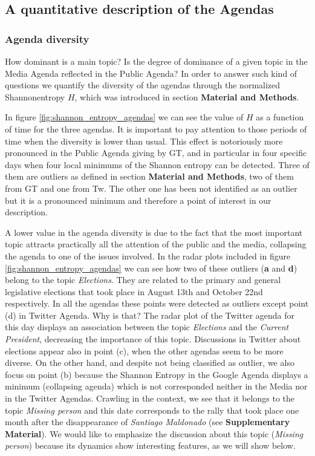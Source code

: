\documentclass{bmcart}
\begin{document}
\subsection*{A quantitative description of the Agendas}

\subsubsection*{Agenda diversity}

\par How dominant is a main topic? Is the degree of dominance of a given topic in the Media Agenda reflected in the Public Agenda? In order to answer such kind of questions we quantify the diversity of the agendas through the normalized Shannonentropy $H$, which was introduced in section \textbf{Material and Methods}.
\par In figure \ref{fig:shannon_entropy_agendas} we can see the value of $H$ as a function of time for the three agendas. It is important to pay attention to those periods of time when the diversity is lower than usual. This effect is notoriously more pronounced in the Public Agenda giving by GT, and in particular in four specific days when four local minimums of the Shannon entropy can be detected. Three of them are outliers as defined in section \textbf{Material and Methods}, two of them from GT and one from Tw. The other one has been not identified as an outlier but it is a pronounced minimum and therefore a point of interest in our description. 
 
\par A lower value in the agenda diversity is due to the fact that the most important topic attracts practically all the attention of the public and the media, collapsing the agenda to one of the issues involved.
In the radar plots included in figure \ref{fig:shannon_entropy_agendas} we can see how two of these outliers (\textbf{a} and \textbf{d}) belong to the topic \emph{Elections}. They are related to the primary and general legislative elections that took place in August 13th and October 22nd respectively.
In all the agendas these points were detected as outliers except point (d) in Twitter Agenda. Why is that? The radar plot of the Twitter agenda for this day displays an association between the topic \emph{Elections} and the \emph{Current President}, decreasing the importance of this topic.
Discussions in Twitter about elections appear also in point (c), when the other agendas seem to be more diverse. 
On the other hand, and despite not being classified as outlier, we also focus on point (b) because the Shannon Entropy in the Google Agenda displays a minimum (collapsing agenda) which is not corresponded neither in the Media nor in the Twitter Agendas. Crawling in the context, we see that it belongs to the topic \emph{Missing person} and this date corresponds to the rally that took place one month after the disappearance of \emph{Santiago Maldonado} (see \textbf{Supplementary Material}). 
We  would like to emphasize the discussion about this topic (\emph{Missing person}) because its dynamics show interesting features, as we will show below.
\end{document}
